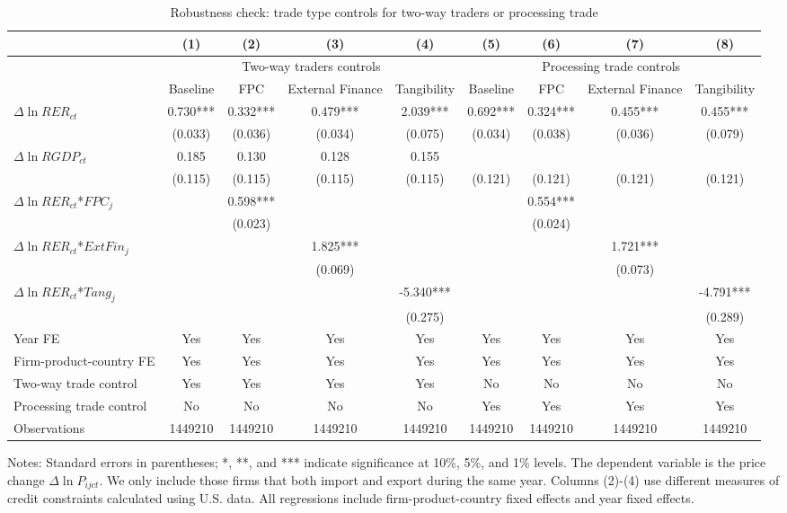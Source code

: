 \documentclass[12pt]{article}
\begin{document}
\begin{table}
	\centering
	\caption{Robustness check: trade type controls for two-way traders or processing trade}
	\begin{threeparttable}
		\begin{tabular}{lcccccccc}
			\toprule
			& (1)   & (2)   & (3)   & (4) &  (5)  &  (6)   & (7)   & (8)\\
			\midrule
			& \multicolumn{4}{c}{Two-way traders controls} & \multicolumn{4}{c}{Processing trade controls}\\
			& Baseline & FPC & External Finance & Tangibility & Baseline & FPC & External Finance & Tangibility\\
			\midrule
			$\Delta \ln RER_{ct}$ & 0.730*** & 0.332*** & 0.479*** & 2.039*** & 0.692*** & 0.324*** & 0.455*** &0.455***\\
			& (0.033) & (0.036) & (0.034) & (0.075) & (0.034) & (0.038) & (0.036) & (0.079)\\
			$\Delta \ln RGDP_{ct}$ & 0.185 & 0.130 & 0.128 & 0.155 &&&&\\
			& (0.115) & (0.115) & (0.115) & (0.115) & (0.121) & (0.121) & (0.121) & (0.121)\\
			$\Delta \ln RER_{ct}$*$FPC_{j}$ &       & 0.598*** &       &  & & 0.554*** &&\\
			&       & (0.023) &       &  &&(0.024)&&\\
			$\Delta \ln RER_{ct}$*$ExtFin_{j}$ &       &       & 1.825*** &  &&& 1.721*** &\\
			&       &       & (0.069) &  &&&(0.073)&\\
			$\Delta \ln RER_{ct}$*$Tang_{j}$ &       &       &       & -5.340*** &&&  &-4.791***\\
			&       &       &       & (0.275) &&&&(0.289)\\
			Year FE  &  Yes   & Yes   & Yes   & Yes &  Yes   & Yes   & Yes   & Yes\\
			Firm-product-country FE &  Yes   & Yes   & Yes   & Yes &  Yes   & Yes   & Yes   & Yes\\
			Two-way trade control &  Yes   & Yes   & Yes   & Yes & No & No & No & No\\
			Processing trade control & No & No & No & No &  Yes   & Yes   & Yes   & Yes \\
			Observations & 1449210 & 1449210 & 1449210 & 1449210 & 1449210 & 1449210 & 1449210 & 1449210\\
			\bottomrule
		\end{tabular}
		\begin{tablenotes}
			\footnotesize
			\item[Notes:] Standard errors in parentheses; *, **, and *** indicate significance at 10\%, 5\%, and 1\% levels. The dependent variable is the price change $\Delta \ln P_{ijct}$. We only include those firms that both import and export during the same year. Columns (2)-(4) use different measures of credit constraints calculated using U.S. data. All regressions include firm-product-country fixed effects and year fixed effects.
		\end{tablenotes}
	\end{threeparttable}
	\label{tab.robust.tradetype}
\end{table}
\end{document}

